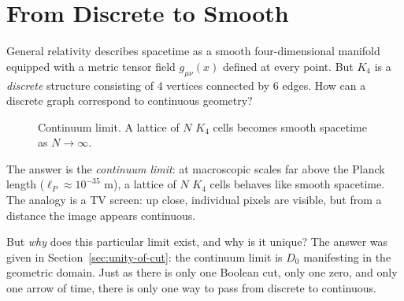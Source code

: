 \documentclass[11pt,a4paper]{book}
\begin{document}
\section{From Discrete to Smooth}

General relativity describes spacetime as a smooth four-dimensional manifold equipped with a metric 
tensor field $g_{\mu\nu}(x)$ defined at every point. But $K_4$ is a \emph{discrete} structure 
consisting of 4 vertices connected by 6 edges. How can a discrete graph correspond to continuous geometry?

\begin{figure}[h]
\centering
{}
\caption{Continuum limit. A lattice of $N$ $K_4$ cells becomes smooth spacetime as $N \to \infty$.}
\label{fig:continuum-holographic}
\end{figure}

The answer is the \emph{continuum limit}: at macroscopic scales far above the Planck length 
($\ell_P \approx 10^{-35}$ m), a lattice of $N$ $K_4$ cells behaves like smooth spacetime. 
The analogy is a TV screen: up close, individual pixels are visible, but from a distance the image 
appears continuous.

But \emph{why} does this particular limit exist, and why is it unique? The answer was 
given in Section~\ref{sec:unity-of-cut}: the continuum limit is $D_0$ manifesting in the 
geometric domain. Just as there is only one Boolean cut, only one zero, and only one arrow 
of time, there is only one way to pass from discrete to continuous.
\end{document}
